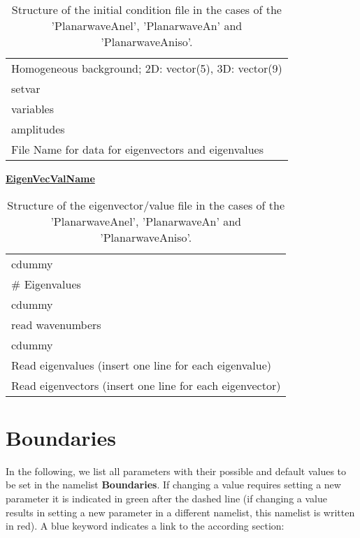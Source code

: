 \documentclass[12pt,twoside]{article}
\begin{document}
\begin{table}[H]
\caption{Structure of the initial condition file in the cases of the 'PlanarwaveAnel', 'PlanarwaveAn' and 'PlanarwaveAniso'.}
\begin{center}
\begin{tabular}{l}
\hline
Homogeneous background; 2D: vector(5), 3D: vector(9)\\
setvar\\
variables\\
amplitudes\\
File Name for data for eigenvectors and eigenvalues\\
\hline
\end{tabular}
\end{center}
\label{ini4-file}
\end{table}



\uline{\textbf{EigenVecValName}}

\begin{table}[H]
\caption{Structure of the eigenvector/value file in the cases of the 'PlanarwaveAnel', 'PlanarwaveAn' and 'PlanarwaveAniso'.}
\begin{center}
\begin{tabular}{l}
\hline
 cdummy\\
 \# Eigenvalues\\
 cdummy\\
 read wavenumbers\\
 cdummy\\
 Read eigenvalues (insert one line for each eigenvalue)\\
 Read eigenvectors (insert one line for each eigenvector)\\
\hline
\end{tabular}
\end{center}
\label{eigenvec2-file}
\end{table}


\newpage

\section{Boundaries}
\label{sec-block-bnd}

In the following, we list all parameters with their possible and default values to be set in the namelist \textbf{Boundaries}.
If changing a value requires setting a new parameter it is indicated in green after the dashed line
(if changing a value results in setting a new parameter in a different namelist, this namelist is written in red).
A blue keyword indicates a link to the according section:\\
\end{document}
